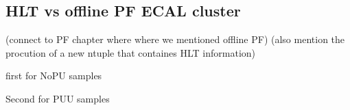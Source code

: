 




\subsection{HLT vs offline PF ECAL cluster}

(connect to PF chapter where where we mentioned offline PF)
(also mention the procution of a new ntuple that containes HLT information) 

first for NoPU samples

Second for PUU samples

